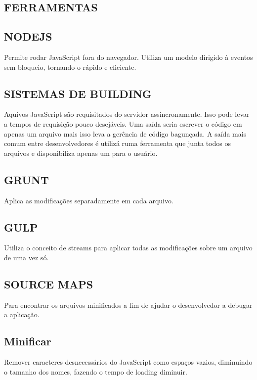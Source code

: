 \documentclass[11pt,a4paper]{article}
\begin{document}
\subsection{FERRAMENTAS}

\subsection{NODEJS}

Permite rodar JavaScript fora do navegador. Utiliza um modelo dirigido
à eventos sem bloqueio, tornando-o rápido e eficiente.

\subsection{SISTEMAS DE BUILDING}

Aquivos JavaScript são requisitados do servidor assincronamente. Isso
pode levar a tempos de requisição pouco desejáveis. Uma saída seria
escrever o código em apenas um arquivo mais isso leva a gerência de
código bagunçada. A saída mais comum entre desenvolvedores é utilizá
ruma ferramenta que junta todos os arquivos e disponibiliza apenas um
para o usuário.

\subsection{GRUNT}

Aplica as modificações separadamente em cada arquivo.

\subsection{GULP}

Utiliza o conceito de streams para aplicar todas as modificações sobre
um arquivo de uma vez só.

\subsection{SOURCE MAPS}

Para encontrar os arquivos minificados a fim de ajudar o desenvolvedor a
debugar a aplicação.

\subsection{Minificar}

Remover caracteres desnecessários do JavaScript como espaços vazios,
diminuindo o tamanho dos nomes, fazendo o tempo de loading diminuir.
\end{document}
